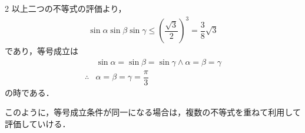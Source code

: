 \documentclass[../../main.tex]{subfiles}
\begin{document}
\begin{multicols}{2}
  以上二つの不等式の評価より，
  \begin{align}
    \sin\alpha\sin\beta\sin\gamma \le \left(\dfrac{\sqrt{3}}{2}\right)^3 = \dfrac{3}{8}\sqrt{3}
  \end{align}
  であり，等号成立は
  \begin{align}
    & \sin\alpha=\sin\beta=\sin\gamma \land \alpha=\beta=\gamma \\
    \therefore
    & \alpha=\beta=\gamma = \dfrac{\pi}{3}
  \end{align}
  の時である．

  このように，等号成立条件が同一になる場合は，複数の不等式を重ねて利用して評価していける．

  \newpage
\end{multicols}
\end{document}
